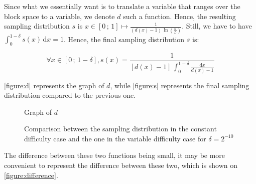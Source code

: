         Since what we essentially want is to translate a variable that ranges over the block space to a variable, we denote \(d\) such a function. Hence, the resulting sampling distribution \(s\) is \(x\in[0\,;\,1]\mapsto\frac{1}{(d(x) - 1)\,\ln\left(\frac{n}{L}\right)}\). Still, we have to have \(\int_0^{1-\delta}s(x)\,\mathrm{d}x=1\). Hence, the final sampling distribution \(s\) is:
        
        \[\forall x\in[0\,;\,1-\delta],s(x)=\frac{1}{[d(x)-1]\,\int_{0}^{1-\delta}\frac{\mathrm{d}x}{d(x)-1}}\]
        
        \autoref{figure:d} represents the graph of \(d\), while \autoref{figure:s} represents the final sampling distribution compared to the previous one.
                
        \begin{figure}[ht]
          \centering
          \caption{Graph of \(d\)}
          \label{figure:d}
        \end{figure}
        
        \begin{figure}[ht]
          \centering
          \caption{Comparison between the sampling distribution in the constant difficulty case and the one in the variable difficulty case for \(\delta=2^{-10}\)}
          \label{figure:s}
        \end{figure}
        
        The difference between these two functions being small, it may be more convenient to represent the difference between these two, which is shown on \autoref{figure:difference}.
        
